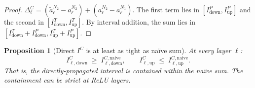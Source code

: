 \documentclass[11pt]{article}
\newcommand{\layerl}{\ell}
\newtheorem{proposition}{Proposition}
\begin{document}
\begin{proof}
$\Delta^C_\layerl = (\tilde{a}^{N_2}_\layerl - a^{N_2}_\layerl) + (a^{N_2}_\layerl - a^{N_1}_\layerl)$.
The first term lies in $[I^P_\text{down}, I^P_\text{up}]$ and the second in
$[I^T_\text{down}, I^T_\text{up}]$. By interval addition, the sum lies in
$[I^T_\text{down} + I^P_\text{down}, I^T_\text{up} + I^P_\text{up}]$.
\end{proof}

\begin{proposition}[Direct $I^C$ is at least as tight as na\"ive sum]
\label{prop:direct_tighter}
At every layer $\layerl$:
\begin{equation}
    I^C_{\layerl,\mathrm{down}} \;\ge\; I^{C,\mathrm{naive}}_{\layerl,\mathrm{down}},
    \qquad
    I^C_{\layerl,\mathrm{up}} \;\le\; I^{C,\mathrm{naive}}_{\layerl,\mathrm{up}}.
\end{equation}
That is, the directly-propagated interval is contained within the na\"ive sum.
The containment can be \emph{strict} at ReLU layers.
\end{proposition}
\end{document}

